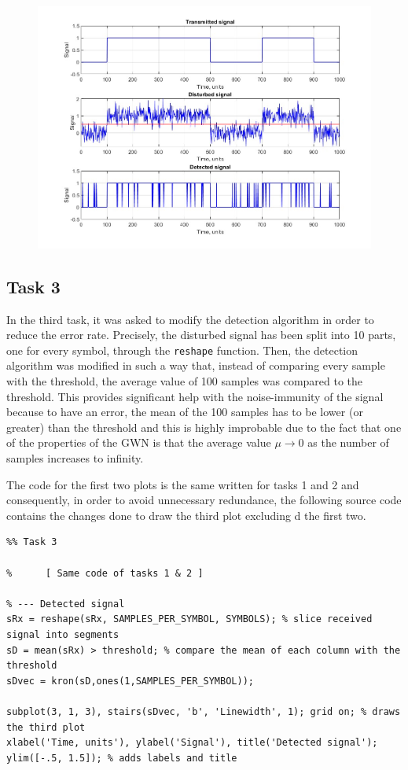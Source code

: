 \begin{figure}[h!]
    \centering
    \includegraphics[width = \textwidth]{lab-2/imgs/task1&2.jpg}
\end{figure}

% 
\subsection*{Task 3}
In the third task, it was asked to modify the detection algorithm in order to reduce the error rate. Precisely, the disturbed signal has been split into 10 parts, one for every symbol, through the \texttt{reshape} function. Then, the detection algorithm was modified in such a way that, instead of comparing every sample with the threshold, the average value of 100 samples was compared to the threshold. This provides significant help with the noise-immunity of the signal because to have an error, the mean of the 100 samples has to be lower (or greater) than the threshold and this is highly improbable due to the fact that one of the properties of the GWN is that the average value $\mu \to 0$ as the number of samples increases to infinity.

The code for the first two plots is the same written for tasks 1 and 2 and consequently, in order to avoid unnecessary redundance, the following source code contains the changes done to draw the third plot excluding d the first two.

\begin{lstlisting}
%% Task 3

%      [ Same code of tasks 1 & 2 ]

% --- Detected signal
sRx = reshape(sRx, SAMPLES_PER_SYMBOL, SYMBOLS); % slice received signal into segments 
sD = mean(sRx) > threshold; % compare the mean of each column with the threshold  
sDvec = kron(sD,ones(1,SAMPLES_PER_SYMBOL)); 

subplot(3, 1, 3), stairs(sDvec, 'b', 'Linewidth', 1); grid on; % draws the third plot
xlabel('Time, units'), ylabel('Signal'), title('Detected signal'); ylim([-.5, 1.5]); % adds labels and title
\end{lstlisting}

